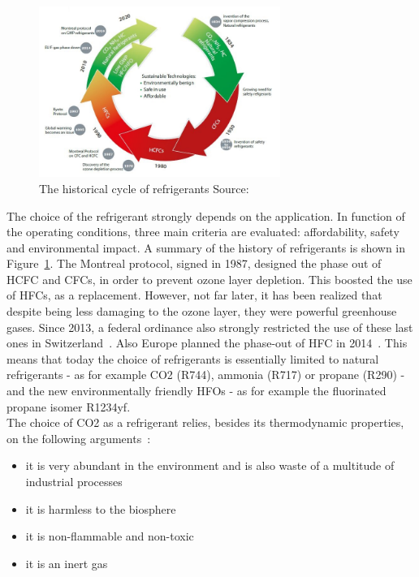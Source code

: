 \documentclass{article}
\begin{document}
\begin{figure}[h!]
	\centering
	\includegraphics[width=0.7\textwidth]{refrigerants.JPG}
	\caption{The historical cycle of refrigerants Source:~\cite{danfossRefrigerantOptionsNow2017}}
	\label{fig:refrigerants}
\end{figure}

The choice of the refrigerant strongly depends on the application. In function of the operating conditions, three main criteria are evaluated: affordability, safety and environmental impact.
A summary of the history of refrigerants is shown in Figure~\ref{fig:refrigerants}.
The Montreal protocol, signed in 1987, designed the phase out of HCFC and CFCs, in order to prevent ozone layer depletion. This boosted the use of HFCs, as a replacement. However, not far later, it has been realized that despite being less damaging to the ozone layer, they were powerful greenhouse gases. Since 2013, a federal ordinance also strongly restricted the use of these last ones in Switzerland~\cite{hydrocarbons21.comSwitzerlandIntroduceHFC}. Also Europe planned the phase-out of HFC in 2014~\cite{europeancommissionforclimateactionEULegislationControl2016}. This means that today the choice of refrigerants is essentially limited to natural refrigerants - as for example CO2 (R744), ammonia (R717) or propane (R290) - and the new environmentally friendly HFOs - as for example the fluorinated propane isomer R1234yf.\\

The choice of CO2 as a refrigerant relies, besides its thermodynamic properties, on the following arguments~\cite{cavalliniPropertiesCO2Refrigerant2004}:
\begin{itemize}
	\item it is very abundant in the environment and is also waste of a multitude of industrial processes
	\item it is harmless to the biosphere
	\item it is non-flammable and non-toxic
	\item it is an inert gas
\end{itemize}
\end{document}
